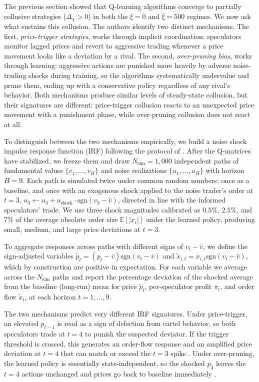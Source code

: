\documentclass[11pt]{article}
\begin{document}
The previous section showed that Q-learning algorithms converge to partially
collusive strategies ($\Delta_\chi > 0$) in both the $\xi = 0$ and $\xi = 500$
regimes. We now ask what sustains this collusion. The authors identify two
distinct mechanisms. The first, \emph{price-trigger strategies}, works through
implicit coordination: speculators monitor lagged prices and revert to
aggressive trading whenever a price movement looks like a deviation by a rival.
The second, \emph{over-pruning bias}, works through learning: aggressive
actions are punished more heavily by adverse noise-trading shocks during
training, so the algorithms systematically undervalue and prune them, ending up with a conservative policy regardless of any rival's behavior. Both
mechanisms produce similar levels of steady-state collusion, but their
signatures are different: price-trigger collusion reacts to an unexpected
price movement with a punishment phase, while over-pruning collusion does not react at all.

To distinguish between the two mechanisms empirically, we build a
noise shock impulse response function (IRF) following the protocol of
\citet[Section~5.3]{Dou2025}. After the Q-matrices have stabilized, we
freeze them and draw $N_{\text{sim}} = 1{,}000$ independent paths of
fundamental values $\{v_1, \ldots, v_H\}$ and noise realizations
$\{u_1, \ldots, u_H\}$ with horizon $H = 9$. Each path is simulated twice
under common random numbers: once as a baseline, and once with an
exogenous shock applied to the noise trader's order at $t = 3$,
$u_3 \leftarrow u_3 + u_{\text{shock}} \cdot \text{sgn}(v_3 - \bar{v})$,
directed in line with the informed speculators' trade. We use three shock
magnitudes calibrated as $0.5\%$, $2.5\%$, and $7\%$ of the average
absolute order size $\mathbb{E}[|x_i|]$ under the learned policy,
producing small, medium, and large price deviations at $t = 3$.

To aggregate responses across paths with different signs of
$v_t - \bar{v}$, we define the sign-adjusted variables
$\tilde{p}_t = (p_t - \bar{v}) \text{sgn}(v_t - \bar{v})$ and
$\tilde{x}_{i,t} = x_{i,t} \text{sgn}(v_t - \bar{v})$, which by
construction are positive in expectation. For each variable we average
across the $N_{\text{sim}}$ paths and report the percentage deviation of
the shocked average from the baseline (long-run) mean for price
$\tilde{p}_t$, per-speculator profit $\pi_t$, and order flow
$\tilde{x}_t$, at each horizon $t = 1, \ldots, 9$.

The two mechanisms predict very different IRF signatures. Under
price-trigger, an elevated $p_{t-1}$ is read as a sign of defection from cartel behavior, so
both speculators trade at $t = 4$ to punish the suspected deviator. If the trigger threshold is crossed, this
generates an order-flow response and an amplified price deviation at
$t = 4$ that can match or exceed the $t = 3$ spike
\citep[Figure~3]{Dou2025}. Under over-pruning, the learned policy is
essentially state-independent, so the shocked $p_3$ leaves the $t = 4$
actions unchanged and prices go back to baseline immediately
\citep[Figure~4]{Dou2025}.
\end{document}
